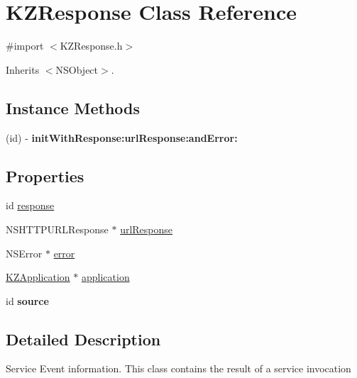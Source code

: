 \hypertarget{interface_k_z_response}{\section{K\-Z\-Response Class Reference}
\label{interface_k_z_response}
}


{\ttfamily \#import $<$K\-Z\-Response.\-h$>$}



Inherits $<$\-N\-S\-Object$>$.

\subsection*{Instance Methods}
\begin{DoxyCompactItemize}
\item 
\hypertarget{interface_k_z_response_ac5b5f4886e6e436adec5757005e9e547}{(id) -\/ {\bfseries init\-With\-Response\-:url\-Response\-:and\-Error\-:}}\label{interface_k_z_response_ac5b5f4886e6e436adec5757005e9e547}

\end{DoxyCompactItemize}
\subsection*{Properties}
\begin{DoxyCompactItemize}
\item 
id \hyperlink{interface_k_z_response_a707d53657a06ad5499fd8befb0c4b489}{response}
\item 
N\-S\-H\-T\-T\-P\-U\-R\-L\-Response $\ast$ \hyperlink{interface_k_z_response_a855244b2bfb700d9043c7b0ac0138ef6}{url\-Response}
\item 
N\-S\-Error $\ast$ \hyperlink{interface_k_z_response_a34afbbe6c009bbb883840f60a9dec08b}{error}
\item 
\hyperlink{interface_k_z_application}{K\-Z\-Application} $\ast$ \hyperlink{interface_k_z_response_a169745670544dd0a05c0f1cca2815588}{application}
\item 
\hypertarget{interface_k_z_response_acf4091bc7ee5a240a3b398049b2b9e2a}{id {\bfseries source}}\label{interface_k_z_response_acf4091bc7ee5a240a3b398049b2b9e2a}

\end{DoxyCompactItemize}


\subsection{Detailed Description}
Service Event information. This class contains the result of a service invocation

